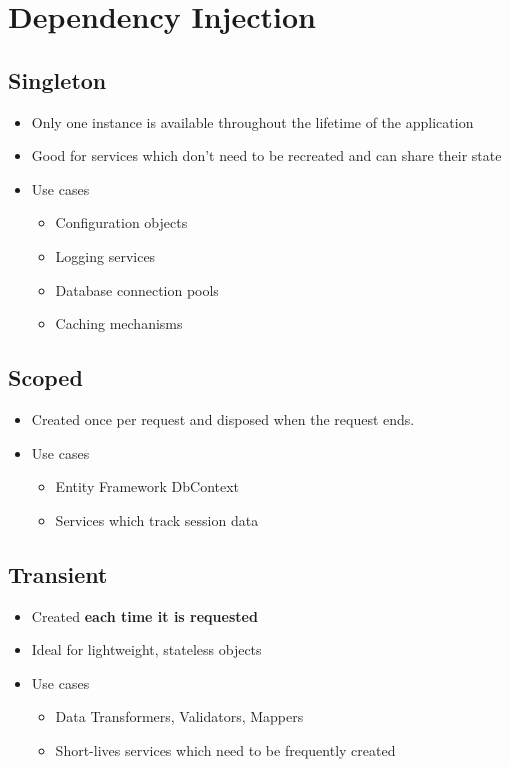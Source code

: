 \chapter{Dependency Injection}

\section{Singleton}
	\begin{itemize}
		\item Only one instance is available throughout the lifetime of the application
		\item Good for services which don't need to be recreated and can share their state
		\item Use cases
		\begin{itemize}
			\item Configuration objects
			\item Logging services
			\item Database connection pools
			\item Caching mechanisms
		\end{itemize}
	\end{itemize}
\section{Scoped}
	\begin{itemize}
		\item Created once per request and disposed when the request ends.
		\item Use cases
		\begin{itemize}
			\item Entity Framework DbContext
			\item Services which track session data
		\end{itemize}
	\end{itemize}
\section{Transient}
	\begin{itemize}
		\item Created \textbf{each time it is requested}
		\item Ideal for lightweight, stateless objects
		\item Use cases
		\begin{itemize}
			\item Data Transformers, Validators, Mappers
			\item Short-lives services which need to be frequently created
		\end{itemize}
	\end{itemize}